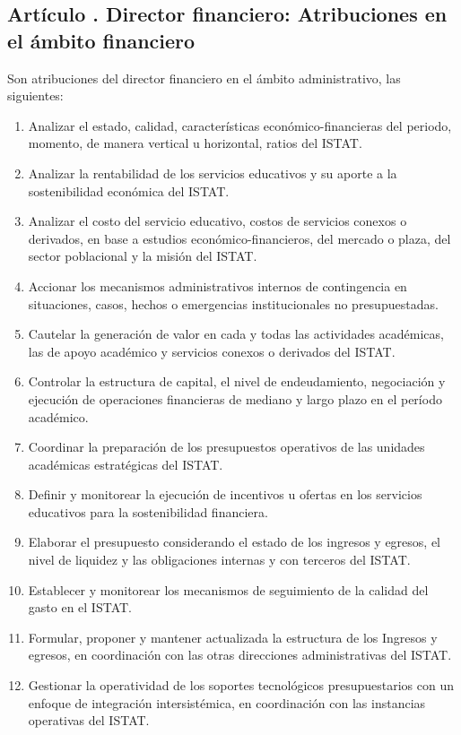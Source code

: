 \subsection{Artículo . Director financiero: Atribuciones en el ámbito financiero}
\addtocounter{ns}{1}
Son atribuciones del director financiero en el ámbito administrativo, las siguientes: 
\begin{enumerate}
\item Analizar el estado, calidad, características económico-financieras del periodo, momento, de manera vertical u horizontal, ratios del ISTAT.  
\item Analizar la rentabilidad de los servicios educativos y su aporte a la sostenibilidad económica del ISTAT. 
\item Analizar el costo del servicio educativo, costos de servicios conexos o derivados, en base a estudios económico-financieros, del mercado o plaza, del sector poblacional y la misión del ISTAT. 
\item Accionar los mecanismos administrativos internos de contingencia en situaciones, casos, hechos o emergencias institucionales no presupuestadas. 
\item Cautelar la generación de valor en cada y todas las actividades académicas, las de apoyo académico y servicios conexos o derivados del ISTAT. 
\item Controlar la estructura de capital, el nivel de endeudamiento, negociación y ejecución de operaciones financieras de mediano y largo plazo en el período académico. 
\item Coordinar la preparación de los presupuestos operativos de las unidades académicas estratégicas del ISTAT. 
\item Definir y monitorear la ejecución de incentivos u ofertas en los servicios educativos para la sostenibilidad financiera. 
\item Elaborar el presupuesto considerando el estado de los ingresos y egresos, el nivel de liquidez y las obligaciones internas y con terceros del ISTAT. 
\item Establecer y monitorear los mecanismos de seguimiento de la calidad del gasto en el ISTAT. 
\item Formular, proponer y mantener actualizada la estructura de los Ingresos y egresos, en coordinación con las otras direcciones administrativas del ISTAT. 
\item Gestionar la operatividad de los soportes tecnológicos presupuestarios con un enfoque de integración intersistémica, en coordinación con las instancias operativas del ISTAT. 

\end{enumerate}
